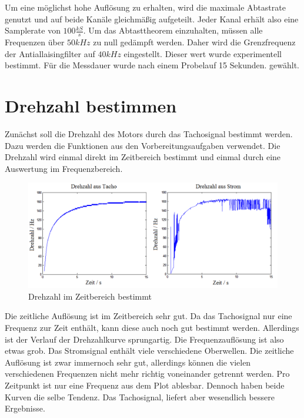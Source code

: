 \documentclass{article}%
\begin{document}
	Um eine möglichst hohe Auflösung zu erhalten, wird die maximale Abtastrate genutzt und auf 
	beide Kanäle gleichmäßig aufgeteilt. Jeder Kanal erhält also eine Samplerate
	von $100\frac{kS}{s}$. Um das Abtasttheorem einzuhalten, müssen alle Frequenzen
	über $50kHz$ zu null gedämpft werden. Daher wird die Grenzfrequenz der
	Antiallaisingfilter auf $40kHz$ eingestellt. Dieser wert wurde experimentell
	bestimmt. Für die Messdauer wurde nach einem Probelauf 15 Sekunden.
	gewählt.  
	

\section{Drehzahl bestimmen}

	Zunächst soll die Drehzahl des Motors durch das Tachosignal bestimmt werden. 
	Dazu werden die Funktionen aus den 
	Vorbereitungsaufgaben verwendet. Die Drehzahl wird einmal direkt im Zeitbereich 
	bestimmt und einmal durch eine Auswertung im Frequenzbereich.

	\begin{figure}[htb]
	\centering
	\includegraphics[width=1\textwidth]{zeitsignale.png}
	\caption{Drehzahl im Zeitbereich bestimmt}
	\end{figure}

	Die zeitliche Auflösung ist im Zeitbereich sehr gut. Da das Tachosignal nur eine Frequenz 
	zur Zeit enthält, kann diese auch noch gut bestimmt werden. Allerdings ist der
	Verlauf der Drehzahlkurve sprungartig. Die Frequenzauflösung ist also etwas grob. 
	Das Stromsignal enthält viele verschiedene Oberwellen. Die zeitliche Auflösung ist zwar immernoch 
	sehr gut, allerdings können die vielen verschiedenen Frequenzen nicht mehr richtig voneinander 
	getrennt werden. Pro Zeitpunkt ist nur eine Frequenz aus dem Plot ablesbar.
	Dennoch haben beide Kurven die selbe Tendenz. Das Tachosignal, liefert aber 
	wesendlich bessere Ergebnisse.
\end{document}
